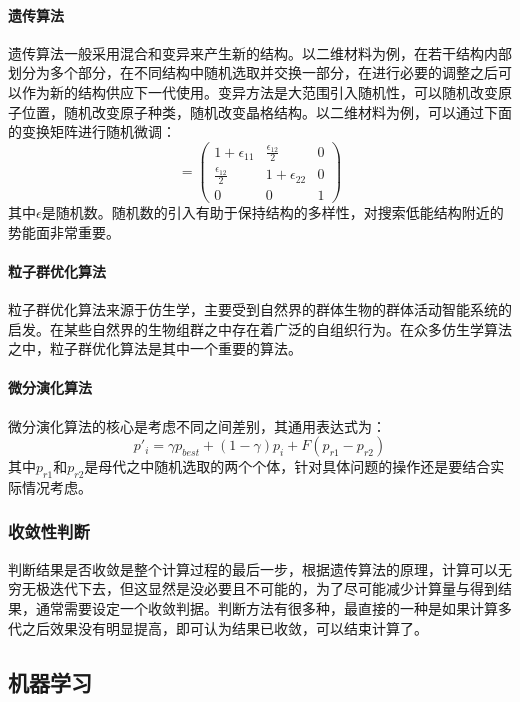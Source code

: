 \paragraph{遗传算法}遗传算法一般采用混合和变异来产生新的结构。以二维材料为例，在若干结构内部划分为多个部分，在不同结构中随机选取并交换一部分，在进行必要的调整之后可以作为新的结构供应下一代使用。变异方法是大范围引入随机性，可以随机改变原子位置，随机改变原子种类，随机改变晶格结构。以二维材料为例，可以通过下面的变换矩阵进行随机微调：
\begin{equation}
    [\bm{I}+\epsilon_{ij}]=
    \begin{pmatrix}
        1+\epsilon_{11}&\frac{\epsilon_{12}}{2}&0\\
        \frac{\epsilon_{12}}{2}&1+\epsilon_{22}&0\\
        0&0&1
    \end{pmatrix}
    \label{eq:yc}
\end{equation}
其中$\epsilon$是随机数。随机数的引入有助于保持结构的多样性，对搜索低能结构附近的势能面非常重要。

\paragraph{粒子群优化算法}粒子群优化算法来源于仿生学，主要受到自然界的群体生物的群体活动智能系统的启发。在某些自然界的生物组群之中存在着广泛的自组织行为。在众多仿生学算法之中，粒子群优化算法是其中一个重要的算法。
\paragraph{微分演化算法}
微分演化算法的核心是考虑不同之间差别，其通用表达式为：
\begin{equation}
    p'_{i}=\gamma p_{best} +(1-\gamma)p_{i}+F(p_{r1}-p_{r2})
    \label{eq:sf}
\end{equation}
其中$p_{r1}\text{和}p_{r2}$是母代之中随机选取的两个个体，针对具体问题的操作还是要结合实际情况考虑。

\subsubsection{收敛性判断}

判断结果是否收敛是整个计算过程的最后一步，根据遗传算法的原理，计算可以无穷无极迭代下去，但这显然是没必要且不可能的，为了尽可能减少计算量与得到结果，通常需要设定一个收敛判据。判断方法有很多种，最直接的一种是如果计算多代之后效果没有明显提高，即可认为结果已收敛，可以结束计算了。

\subsection{机器学习}

